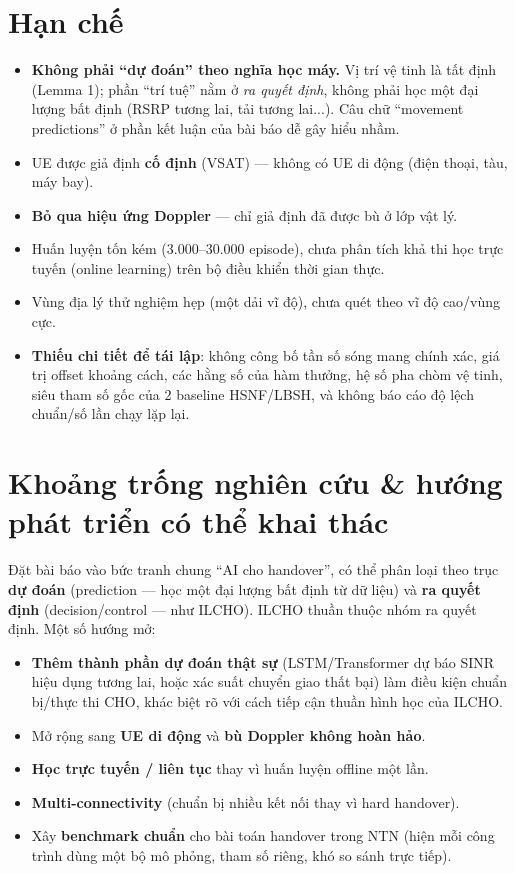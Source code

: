 \documentclass[12pt,a4paper]{article}
\begin{document}
\section{Hạn chế}

\begin{itemize}[leftmargin=1.2em]
  \item \textbf{Không phải ``dự đoán'' theo nghĩa học máy.} Vị trí vệ tinh là tất định (Lemma
        1); phần ``trí tuệ'' nằm ở \emph{ra quyết định}, không phải học một đại lượng bất
        định (RSRP tương lai, tải tương lai...). Câu chữ ``movement predictions'' ở phần kết
        luận của bài báo dễ gây hiểu nhầm.
  \item UE được giả định \textbf{cố định} (VSAT) — không có UE di động (điện thoại, tàu, máy
        bay).
  \item \textbf{Bỏ qua hiệu ứng Doppler} — chỉ giả định đã được bù ở lớp vật lý.
  \item Huấn luyện tốn kém (3.000--30.000 episode), chưa phân tích khả thi học trực tuyến
        (online learning) trên bộ điều khiển thời gian thực.
  \item Vùng địa lý thử nghiệm hẹp (một dải vĩ độ), chưa quét theo vĩ độ cao/vùng cực.
  \item \textbf{Thiếu chi tiết để tái lập}: không công bố tần số sóng mang chính xác, giá trị
        offset khoảng cách, các hằng số của hàm thưởng, hệ số pha chòm vệ tinh, siêu tham số
        gốc của 2 baseline HSNF/LBSH, và không báo cáo độ lệch chuẩn/số lần chạy lặp lại.
\end{itemize}

\section{Khoảng trống nghiên cứu \& hướng phát triển có thể khai thác}

Đặt bài báo vào bức tranh chung ``AI cho handover'', có thể phân loại theo trục
\textbf{dự đoán} (prediction — học một đại lượng bất định từ dữ liệu) và \textbf{ra quyết
định} (decision/control — như ILCHO). ILCHO thuần thuộc nhóm ra quyết định. Một số hướng mở:

\begin{itemize}[leftmargin=1.2em]
  \item \textbf{Thêm thành phần dự đoán thật sự} (LSTM/Transformer dự báo SINR hiệu dụng
        tương lai, hoặc xác suất chuyển giao thất bại) làm điều kiện chuẩn bị/thực thi CHO,
        khác biệt rõ với cách tiếp cận thuần hình học của ILCHO.
  \item Mở rộng sang \textbf{UE di động} và \textbf{bù Doppler không hoàn hảo}.
  \item \textbf{Học trực tuyến / liên tục} thay vì huấn luyện offline một lần.
  \item \textbf{Multi-connectivity} (chuẩn bị nhiều kết nối thay vì hard handover).
  \item Xây \textbf{benchmark chuẩn} cho bài toán handover trong NTN (hiện mỗi công trình dùng
        một bộ mô phỏng, tham số riêng, khó so sánh trực tiếp).
\end{itemize}
\end{document}

